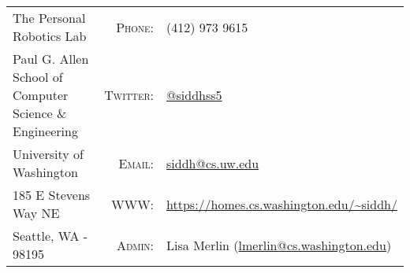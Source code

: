 
\begin{center}
\begin{tabular}{lrl}
The Personal Robotics Lab & \textsc{Phone:} & (412) 973 9615 \\
Paul G. Allen School of Computer Science \& Engineering& \textsc{Twitter:} & \href{https://twitter.com/siddhss5}{@siddhss5} \\
University of Washington& \textsc{Email:} & \url{siddh@cs.uw.edu}\\
185 E Stevens Way NE&  \textsc{WWW:} & \url{https://homes.cs.washington.edu/~siddh/}\\
Seattle, WA - 98195 & \textsc{Admin:} & Lisa Merlin (\url{lmerlin@cs.washington.edu})
\end{tabular}
\end{center}
